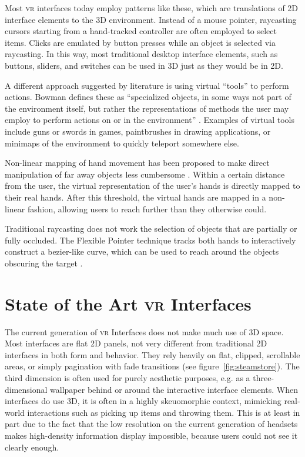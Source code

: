 \documentclass{tufte-book} %
\begin{document}
Most \textsc{vr} interfaces today employ patterns like these, which are translations of 2D interface elements to the 3D environment. Instead of a mouse pointer, raycasting cursors starting from a hand-tracked controller are often employed to select items. Clicks are emulated by button presses while an object is selected via raycasting. In this way, most traditional desktop interface elements, such as buttons, sliders, and switches can be used in 3D just as they would be in 2D.

A different approach suggested by literature is using virtual ``tools'' to perform actions. Bowman defines these as ``specialized objects, in some ways not part of the environment itself, but rather the representations of methods the user may employ to perform actions on or in the environment'' \cite{bowman1995user}. Examples of virtual tools include guns or swords in games, paintbrushes in drawing applications, or minimaps of the environment to quickly teleport somewhere else.

Non-linear mapping of hand movement has been proposed to make direct manipulation of far away objects less cumbersome \cite{poupyrev1996go}. Within a certain distance from the user, the virtual representation of the user's hands is directly mapped to their real hands. After this threshold, the virtual hands are mapped in a non-linear fashion, allowing users to reach further than they otherwise could.

Traditional raycasting does not work the selection of objects that are partially or fully occluded. The Flexible Pointer technique tracks both hands to interactively construct a bezier-like curve, which can be used to reach around the objects obscuring the target \cite{feiner2003flexible}.


\section{State of the Art \textsc{vr} Interfaces}
The current generation of \textsc{vr} Interfaces does not make much use of 3D space. Most interfaces are flat 2D panels, not very different from traditional 2D interfaces in both form and behavior. They rely heavily on flat, clipped, scrollable areas, or simply pagination with fade transitions (see figure~\ref{fig:steamstore}). The third dimension is often used for purely aesthetic purposes, e.g. as a three-dimensional wallpaper behind or around the interactive interface elements. When interfaces do use 3D, it is often in a highly skeuomorphic context, mimicking real-world interactions such as picking up items and throwing them.
This is at least in part due to the fact that the low resolution on the current generation of headsets makes high-density information display impossible, because users could not see it clearly enough.
\end{document}
